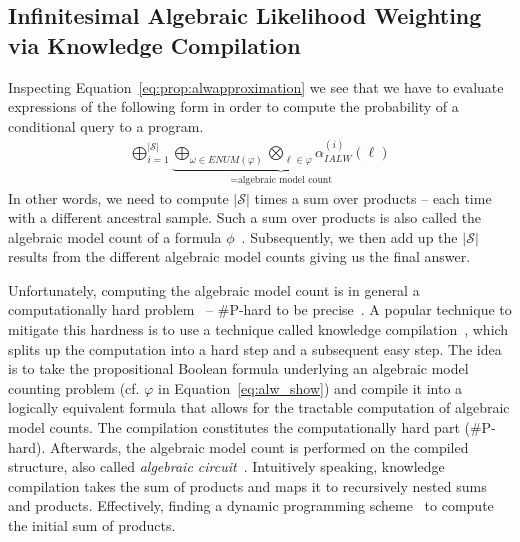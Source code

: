 




\subsection{Infinitesimal Algebraic Likelihood Weighting via Knowledge Compilation}
\label{sec:ALWviaKC}


Inspecting Equation~\ref{eq:prop:alwapproximation} we see that we have to evaluate expressions of the following form in order to compute the probability of a conditional query to a \dcproblogsty program.
\begin{align}
    \bigoplus_{i=1}^{\lvert \mathcal{S} \rvert} \underbrace{\bigoplus_{\omega\in ENUM(\varphi)} \bigotimes_{\ell \in \varphi}  \alpha_{IALW}^{(i)} \left(\ell \right)}_{= \text{algebraic model count}} \label{eq:alw_show}
\end{align}
In other words, we need to compute $\lvert \mathcal{S} \rvert$ times a sum over products -- each time with a different ancestral sample. Such a sum over products is also called the algebraic model count of  a formula $\phi$~\citep{kimmig2017algebraic}. 
Subsequently, we then add up the $\lvert \mathcal{S} \rvert$ results from the different algebraic model counts giving us the final answer.

Unfortunately, computing the algebraic model count is in general a computationally hard problem~\citep{kimmig2017algebraic} -- \#P-hard to be precise~\citep{valiant1979complexity}.
A popular technique to mitigate this hardness is to use a technique called knowledge compilation~\citep{darwiche2002knowledge}, which splits up the computation into a hard step and a subsequent easy step. The idea is to take the propositional Boolean formula underlying 
an algebraic model counting problem (cf. $\varphi$ in Equation~\ref{eq:alw_show}) and compile it into a logically equivalent formula that allows for the tractable computation of algebraic model counts. The compilation constitutes the computationally hard part (\#P-hard). Afterwards, the algebraic model count is performed on the compiled structure, also called {\em algebraic circuit}~\citep{zuidbergdosmartires2019transforming}. Intuitively speaking, knowledge compilation takes the sum of products and maps it to recursively nested sums and products. Effectively, finding a dynamic programming scheme~\citep{bellman1957dynamic} to compute the initial sum of products.

